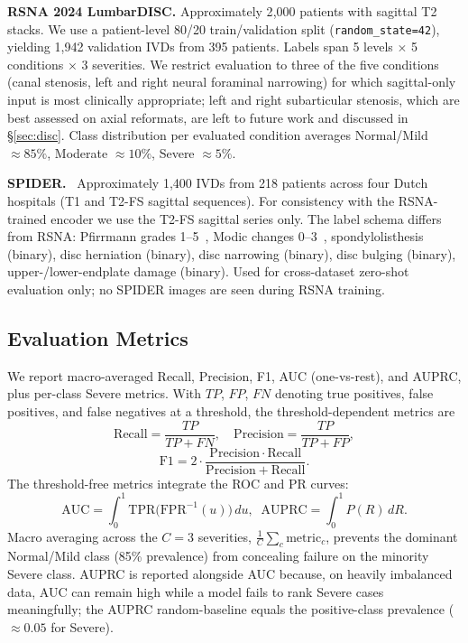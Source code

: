 \documentclass[runningheads]{llncs}
\begin{document}
\textbf{RSNA 2024 LumbarDISC.} Approximately 2{,}000 patients with
sagittal T2 stacks. We use a patient-level 80/20 train/validation split
(\verb|random_state=42|), yielding 1{,}942 validation IVDs from 395
patients. Labels span 5 levels $\times$ 5 conditions $\times$ 3
severities. We restrict evaluation to three of the five conditions
(canal stenosis, left and right neural foraminal narrowing) for which
sagittal-only input is most clinically appropriate; left and right
subarticular stenosis, which are best assessed on axial reformats,
are left to future work and discussed in \S\ref{sec:disc}. Class
distribution per evaluated condition averages Normal/Mild $\approx 85\%$,
Moderate $\approx 10\%$, Severe $\approx 5\%$.

\textbf{SPIDER.}~\cite{vandergraaf2024spider} Approximately 1{,}400
IVDs from 218 patients across four Dutch hospitals (T1 and T2-FS
sagittal sequences). For consistency with the RSNA-trained encoder we
use the T2-FS sagittal series only. The label schema differs from
RSNA: Pfirrmann grades 1--5~\cite{pfirrmann2001}, Modic
changes 0--3~\cite{modic1988},
spondylolisthesis (binary), disc herniation (binary), disc narrowing
(binary), disc bulging (binary), upper-/lower-endplate damage
(binary). Used for cross-dataset zero-shot evaluation only; no SPIDER
images are seen during RSNA training.

\subsection{Evaluation Metrics}

We report macro-averaged Recall, Precision, F1, AUC (one-vs-rest), and
AUPRC, plus per-class Severe metrics. With $TP$, $FP$, $FN$ denoting
true positives, false positives, and false negatives at a threshold,
the threshold-dependent metrics are
\begin{equation}
\mathrm{Recall} = \frac{TP}{TP + FN},\quad
\mathrm{Precision} = \frac{TP}{TP + FP},
\label{eq:recprec}
\end{equation}
\begin{equation}
\mathrm{F1} = 2\cdot\frac{\mathrm{Precision}\cdot\mathrm{Recall}}
                         {\mathrm{Precision} + \mathrm{Recall}}.
\label{eq:f1}
\end{equation}
The threshold-free metrics integrate the ROC and PR curves:
\begin{equation}
\mathrm{AUC} = \int_{0}^{1} \mathrm{TPR}\!\big(\mathrm{FPR}^{-1}(u)\big)\,du,
\;\;
\mathrm{AUPRC} = \int_{0}^{1} P(R)\,dR.
\label{eq:auc_auprc}
\end{equation}
Macro averaging across the $C{=}3$ severities, $\frac{1}{C}\sum_{c}
\mathrm{metric}_c$, prevents the dominant Normal/Mild class (85\%
prevalence) from concealing failure on the minority Severe class. AUPRC
is reported alongside AUC because, on heavily imbalanced data, AUC can
remain high while a model fails to rank Severe cases meaningfully; the
AUPRC random-baseline equals the positive-class prevalence
($\approx 0.05$ for Severe).
\end{document}
